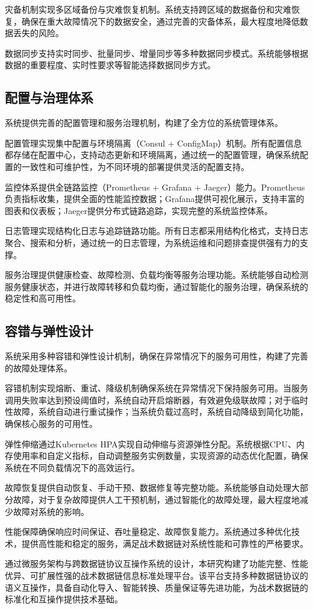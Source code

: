 灾备机制实现多区域备份与灾难恢复机制。系统支持跨区域的数据备份和灾难恢复，确保在重大故障情况下的数据安全，通过完善的灾备体系，最大程度地降低数据丢失的风险。

数据同步支持实时同步、批量同步、增量同步等多种数据同步模式。系统能够根据数据的重要程度、实时性要求等智能选择数据同步方式。

\subsection{配置与治理体系}

系统提供完善的配置管理和服务治理机制，构建了全方位的系统管理体系。

配置管理实现集中配置与环境隔离（Consul + ConfigMap）机制。所有配置信息都存储在配置中心，支持动态更新和环境隔离，通过统一的配置管理，确保系统配置的一致性和可维护性，为不同环境的部署提供灵活的配置支持。

监控体系提供全链路监控（Prometheus + Grafana + Jaeger）能力。Prometheus负责指标收集，提供全面的性能监控数据；Grafana提供可视化展示，支持丰富的图表和仪表板；Jaeger提供分布式链路追踪，实现完整的系统监控体系。

日志管理实现结构化日志与追踪链路功能。所有日志都采用结构化格式，支持日志聚合、搜索和分析，通过统一的日志管理，为系统运维和问题排查提供强有力的支撑。

服务治理提供健康检查、故障检测、负载均衡等服务治理功能。系统能够自动检测服务健康状态，并进行故障转移和负载均衡，通过智能化的服务治理，确保系统的稳定性和高可用性。

\subsection{容错与弹性设计}

系统采用多种容错和弹性设计机制，确保在异常情况下的服务可用性，构建了完善的故障处理体系。

容错机制实现熔断、重试、降级机制确保系统在异常情况下保持服务可用。当服务调用失败率达到预设阈值时，系统自动开启熔断器，有效避免级联故障；对于临时性故障，系统自动进行重试操作；当系统负载过高时，系统自动降级到简化功能，确保核心服务的可用性。

弹性伸缩通过Kubernetes HPA实现自动伸缩与资源弹性分配。系统根据CPU、内存使用率和自定义指标，自动调整服务实例数量，实现资源的动态优化配置，确保系统在不同负载情况下的高效运行。

故障恢复提供自动恢复、手动干预、数据修复等完整功能。系统能够自动处理大部分故障，对于复杂故障提供人工干预机制，通过智能化的故障处理，最大程度地减少故障对系统的影响。

性能保障确保响应时间保证、吞吐量稳定、故障恢复能力。系统通过多种优化技术，提供高性能和稳定的服务，满足战术数据链对系统性能和可靠性的严格要求。

通过微服务架构与跨数据链协议互操作系统的设计，本研究构建了功能完整、性能优异、可扩展性强的战术数据链信息标准处理平台。该平台支持多种数据链协议的语义互操作，具备自动化导入、智能转换、质量保证等先进功能，为战术数据链的标准化和互操作提供技术基础。